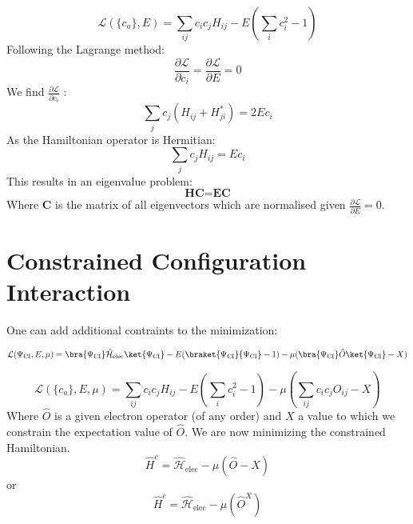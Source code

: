 \begin{equation}
      \mathcal{L}(\{ c_a \}, E) = \sum_{ij}  c_i c_j  H_{ij} - E (\sum_i c^{2}_{i} - 1)
\end{equation}
Following the Lagrange method:
\begin{equation}
        \frac{\partial \mathcal{L}}{\partial c_i} =  \frac{\partial \mathcal{L}}{\partial E} = 0
\end{equation}
We find $\frac{\partial \mathcal{L}}{\partial c_i}$ :
\begin{equation}
    \sum_{j} c_j (H_{ij} + H_{ji}^*) = 2 E c_i
\end{equation}
As the Hamiltonian operator is Hermitian:
\begin{equation}
  \sum_{j} c_j H_{ij} = E c_i
\end{equation}
  This results in an eigenvalue problem:
\begin{equation}
      \textbf{H} \textbf{C} = \textbf{E} \textbf{C}
\end{equation}
Where \textbf{C} is the matrix of all eigenvectors which are normalised given  $\frac{\partial \mathcal{L}}{\partial E} = 0$.

\section{Constrained Configuration Interaction}
One can add additional contraints to the minimization:

\begin{equation}
      \mathcal{L}(\Psi_{\text{CI}}, E, \mu) = \bra{\Psi_\text{CI}} \hat{\mathcal{H}}_\text{elec} \ket{\Psi_{\text{CI}}} - E (\braket{\Psi_{\text{CI}}}{\Psi_{\text{CI}}} - 1) - \mu (\bra{\Psi_\text{CI}}\hat{O}\ket{\Psi_\text{CI}} - X)
  \end{equation}

  \begin{equation}
        \mathcal{L}(\{ c_a \}, E, \mu) = \sum_{ij}  c_i c_j  H_{ij} - E (\sum_i c^{2}_{i} - 1) - \mu (\sum_{ij} c_i c_j O_{ij} - X)
    \end{equation}
Where $\hat{O}$ is a given electron operator (of any order) and $X$ a value to which we constrain the expectation value of $\hat{O}$.
We are now minimizing the constrained Hamiltonian.
\begin{equation}\label{eq:constrained_ham}
  \hat{H}^c = \hat{\mathcal{H}}_\text{elec}  - \mu (\hat{O} - X)
\end{equation}
or
\begin{equation}\label{eq:constrained_ham_X}
  \hat{H}^c = \hat{\mathcal{H}}_\text{elec}  - \mu (\hat{O}^X)
\end{equation}

